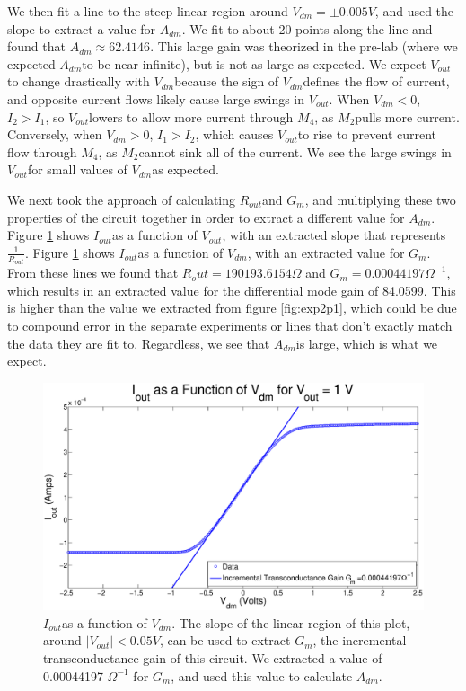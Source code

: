 \documentclass{article}
\newcommand{\Vout}{{$V_{out}$}}
\newcommand{\Vdm}{{$V_{dm}$}}
\newcommand{\Iout}{{$I_{out}$}}
\newcommand{\Gm}{{$G_{m}$}}
\newcommand{\Mtwo}{{$M_{2}$}}
\newcommand{\Mfour}{{$M_{4}$}}
\newcommand{\Adm}{{$A_{dm}$}}
\newcommand{\Rout}{{$R_{out}$}}
\begin{document}
We then fit a line to the steep linear region around $V_{dm} = \pm 0.005 V$, and used the slope to extract a value for \Adm. We fit to about 20 points along the line and found that $A_{dm} \approx 62.4146$. This large gain was theorized in the pre-lab (where we expected \Adm to be near infinite), but is not as large as expected. We expect \Vout to change drastically with \Vdm because the sign of \Vdm defines the flow of current, and opposite current flows likely cause large swings in \Vout. When $V_{dm} < 0$, $I_2 > I_1$, so \Vout lowers to allow more current through \Mfour, as \Mtwo pulls more current. Conversely, when $V_{dm} > 0$, $I_1 > I_2$, which causes \Vout to rise to prevent current flow through \Mfour, as \Mtwo cannot sink all of the current. We see the large swings in \Vout for small values of \Vdm as expected.

We next took the approach of calculating \Rout and \Gm, and multiplying these two properties of the circuit together in order to extract a different value for \Adm. Figure \ref{fig:exp2p3} shows \Iout as a function of \Vout, with an extracted slope that represents $\frac{1}{R_{out}}$. Figure \ref{fig:exp2p3} shows \Iout as a function of \Vdm, with an extracted value for \Gm. From these lines we found that $R_out = 190193.6154 \Omega$ and $G_m = 0.00044197 \Omega^{-1}$, which results in an extracted value for the differential mode gain of 84.0599. This is higher than the value we extracted from figure \ref{fig:exp2p1}, which could be due to compound error in the separate experiments or lines that don't exactly match the data they are fit to. Regardless, we see that \Adm is large, which is what we expect.

\begin{figure}[H]
\centering
\includegraphics[width=\linewidth]{../Figures/Exp2P3.eps}
\caption{\Iout as a function of \Vdm. The slope of the linear region of this plot, around $|V_{out}| < 0.05 V$, can be used to extract \Gm, the incremental transconductance gain of this circuit. We extracted a value of 0.00044197 $\Omega^{-1}$ for \Gm, and used this value to calculate \Adm.}
\label{fig:exp2p3}
\end{figure}
\end{document}
